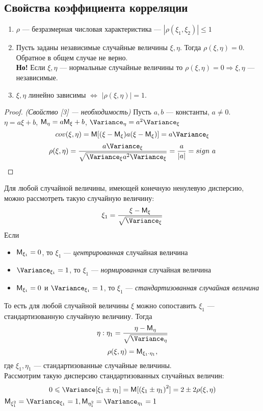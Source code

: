 \subsection{Свойства коэффициента корреляции}
\begin{enumerate}
  \item $\rho$ --- безразмерная числовая характеристика --- $| \rho(\xi_1, \xi_2) | \leqslant 1$
  \item Пусть заданы независимые случайные величины $\xi, \eta$. Тогда $\rho(\xi, \eta) = 0$. Обратное в общем случае не верно. \\
  \textbf{Но!} Если $\xi, \eta$ --- нормальные случайные величины то $\rho(\xi, \eta) = 0 \Rightarrow \xi, \eta$ --- независимые.
  \item $\xi, \eta$ линейно зависимы $\Leftrightarrow$ $| \rho(\xi, \eta) | = 1$.
  \end{enumerate}
  \begin{proof} \textit{(Свойство [3] --- необходимость)}
    Пусть $a, b$ --- константы, $a \neq 0$.\\
    $\eta = a\xi + b$, $\mathsf{M}_{\eta} = a \mathsf{M}_{\xi} + b$, $\Variance_{\eta} = a^2 \Variance_{\xi}$
    \[
      cov(\xi, \eta) = \MExpect [(\xi - \MExpect_{\xi})a(\xi - \MExpect_{\xi})] = a \Variance_{\xi}
    \]
    \[
      \rho (\xi, \eta) = \frac{a \Variance_{\xi}}{\sqrt{\Variance_{\xi} a^2 \Variance_{\xi}}} = \frac{a}{|a|} = sign \ a
    \]
  \end{proof}
  \begin{interjection}
    Для любой случайной величины, имеющей конечную ненулевую дисперсию, можно рассмотреть такую случайную величину:
    \[
      \xi_1 = \frac{\xi - \MExpect_{\xi}}{\sqrt{\Variance_{\xi}}}
    \]
    Если
    \begin{itemize}
      \item $\mathsf{M}_{\xi_1} = 0$, то $\xi_1$ --- \textit{центрированная} случайная величина
      \item $\Variance_{\xi_1} = 1$, то $\xi_1$ --- \textit{нормированная} случайная величина
      \item $\mathsf{M}_{\xi_1} = 0$ и $\Variance_{\xi_1} = 1$, то $\xi_1$ --- \textit{стандартизованная случайная величина}
    \end{itemize}
    То есть для любой случайной величины $\xi$ можно сопоставить $\xi_1$ --- стандартизованную случайную величину. Тогда
    \[
      \eta : \eta_1 = \frac{\eta - \MExpect_{\eta}}{\sqrt{\Variance_{\eta}}}
    \]
    \[
      \rho (\xi, \eta) = \mathsf{M}_{\xi_1 \cdot \eta_1},
    \]
    где $\xi_1, \eta_1$ --- стандартизованные случайные величины. \\
    Рассмотрим такую дисперсию стандартизованных случайных величин:
    \[
      0 \leqslant \Variance [\xi_1 \pm \eta_1] = \MExpect [{(\xi_1 \pm \eta_1)}^2] = 2 \pm 2 \rho(\xi, \eta)
    \]
    $\MExpect_{\xi_1^2} = \Variance_{\xi_1} = 1, \MExpect_{\eta_1^2} = \Variance_{\eta_1} = 1$
  \end{interjection}
